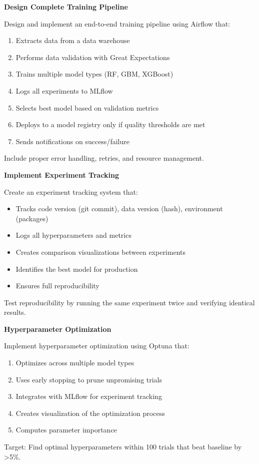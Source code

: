 \begin{exercise}
\textbf{Design Complete Training Pipeline}

Design and implement an end-to-end training pipeline using Airflow that:
\begin{enumerate}
    \item Extracts data from a data warehouse
    \item Performs data validation with Great Expectations
    \item Trains multiple model types (RF, GBM, XGBoost)
    \item Logs all experiments to MLflow
    \item Selects best model based on validation metrics
    \item Deploys to a model registry only if quality thresholds are met
    \item Sends notifications on success/failure
\end{enumerate}

Include proper error handling, retries, and resource management.
\end{exercise}

\begin{exercise}
\textbf{Implement Experiment Tracking}

Create an experiment tracking system that:
\begin{itemize}
    \item Tracks code version (git commit), data version (hash), environment (packages)
    \item Logs all hyperparameters and metrics
    \item Creates comparison visualizations between experiments
    \item Identifies the best model for production
    \item Ensures full reproducibility
\end{itemize}

Test reproducibility by running the same experiment twice and verifying identical results.
\end{exercise}

\begin{exercise}
\textbf{Hyperparameter Optimization}

Implement hyperparameter optimization using Optuna that:
\begin{enumerate}
    \item Optimizes across multiple model types
    \item Uses early stopping to prune unpromising trials
    \item Integrates with MLflow for experiment tracking
    \item Creates visualization of the optimization process
    \item Computes parameter importance
\end{enumerate}

Target: Find optimal hyperparameters within 100 trials that beat baseline by >5\%.
\end{exercise}

